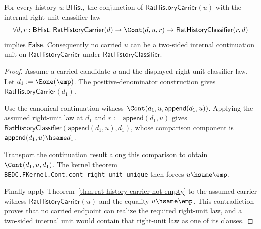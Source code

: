 \begin{theorem}
\label{thm:field-rat-denominator-continuation-no-internal-unit}
For every history $u:\mathsf{BHist}$, the conjunction of
$\mathsf{RatHistoryCarrier}(u)$ with the internal right-unit classifier law
$$
\forall d,r:\mathsf{BHist}.\;
\mathsf{RatHistoryCarrier}(d)\to
\Cont(d,u,r)\to
\mathsf{RatHistoryClassifier}(r,d)
$$
implies $\mathsf{False}$. Consequently no carried $u$ can be a two-sided
internal continuation unit on $\mathsf{RatHistoryCarrier}$ under
$\mathsf{RatHistoryClassifier}$.
\end{theorem}
\begin{proof}
Assume a carried candidate $u$ and the displayed right-unit classifier law.
Let $d_1:=\Eone(\emp)$. The positive-denominator construction gives
$\mathsf{RatHistoryCarrier}(d_1)$.

Use the canonical continuation witness
$\Cont(d_1,u,\mathsf{append}(d_1,u))$. Applying the assumed right-unit law at
$d_1$ and $r:=\mathsf{append}(d_1,u)$ gives
$\mathsf{RatHistoryClassifier}(\mathsf{append}(d_1,u),d_1)$, whose comparison
component is $\mathsf{append}(d_1,u)\hsame d_1$.

Transport the continuation result along this comparison to obtain
$\Cont(d_1,u,d_1)$. The kernel theorem
\texttt{BEDC.FKernel.Cont.cont\_right\_unit\_unique} then forces
$u\hsame\emp$.

Finally apply Theorem~\ref{thm:rat-history-carrier-not-empty} to the assumed
carrier witness $\mathsf{RatHistoryCarrier}(u)$ and the equality
$u\hsame\emp$. This contradiction proves that no carried endpoint can realize
the required right-unit law, and a two-sided internal unit would contain that
right-unit law as one of its clauses.
\end{proof}

